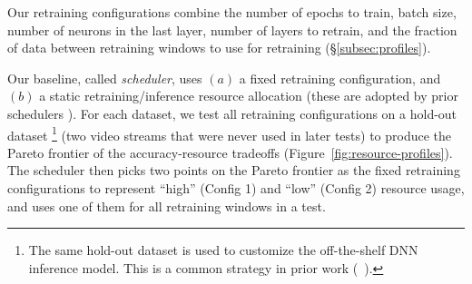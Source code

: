 Our retraining configurations combine the number of epochs to train, batch size, number of neurons in the last layer, number of layers to retrain, and the fraction of data between retraining windows to use for retraining (\S\ref{subsec:profiles}). 




Our baseline, called {\em \fair scheduler},  %
uses $(a)$ a fixed retraining configuration, and $(b)$ a static retraining/inference resource allocation (these are adopted by prior schedulers \cite{fair-1, fair-2, videostorm}). 
For each dataset, we test all retraining configurations on a hold-out dataset \footnote{
The same hold-out dataset is used to customize the off-the-shelf DNN inference model. This is a common strategy in prior work (\eg~\cite{noscope}).} (\ie two video streams that were never used in later tests) to produce the Pareto frontier of the accuracy-resource tradeoffs %
(\eg Figure~\ref{fig:resource-profiles}). 
The \fair scheduler then picks two points on the Pareto frontier as the fixed retraining configurations to represent ``high'' (Config 1)  and ``low'' (Config 2) resource usage, and uses one of them for all retraining windows in a test.

